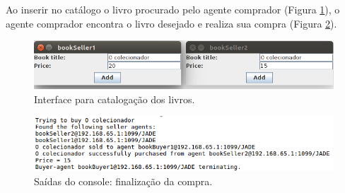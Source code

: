 Ao inserir no catálogo o livro procurado pelo agente comprador (Figura \ref{fig:book-trading03}), o agente comprador encontra o livro desejado e realiza sua compra (Figura \ref{fig:book-trading04}).

\begin{figure}[!h]
\centering
\includegraphics[scale=0.4]{figuras/contract-net/book-trading03}
\caption{Interface para catalogação dos livros.}
\label{fig:book-trading03}
\end{figure}

\begin{figure}[!h]
\centering
\includegraphics[scale=0.55]{figuras/contract-net/book-trading04}
\caption{Saídas do console: finalização da compra.}
\label{fig:book-trading04}
\end{figure}